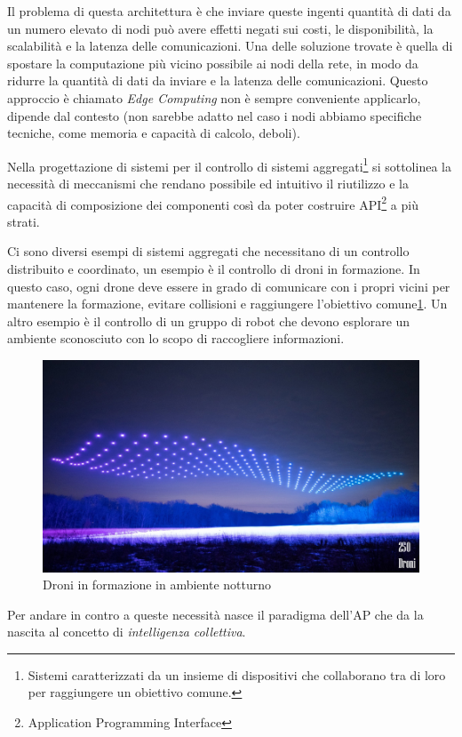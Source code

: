 \documentclass[12pt,a4paper,openright,twoside]{book}
\begin{document}
Il problema di questa architettura è che inviare queste ingenti quantità di dati da un numero elevato di nodi può avere effetti negati sui costi, le disponibilità, la scalabilità e la latenza delle comunicazioni. Una delle soluzione trovate è quella di spostare la computazione più vicino possibile ai nodi della rete, in modo da ridurre la quantità di dati da inviare e la latenza delle comunicazioni. Questo approccio è chiamato \textit{Edge Computing} non è sempre conveniente applicarlo, dipende dal contesto (non sarebbe adatto nel caso i nodi abbiamo specifiche tecniche, come memoria e capacità di calcolo, deboli). 

Nella progettazione di sistemi per il controllo di sistemi aggregati\footnote{Sistemi caratterizzati da un insieme di dispositivi che collaborano tra di loro per raggiungere un obiettivo comune.} si sottolinea la necessità di meccanismi che rendano possibile ed intuitivo il riutilizzo e la capacità di composizione dei componenti così da poter costruire API\footnote{Application Programming Interface} a più strati.

Ci sono diversi esempi di sistemi aggregati che necessitano di un controllo distribuito e coordinato, un esempio è il controllo di droni in formazione. In questo caso, ogni drone deve essere in grado di comunicare con i propri vicini per mantenere la formazione, evitare collisioni e raggiungere l'obiettivo comune\cref{fig:drones}. Un altro esempio è il controllo di un gruppo di robot che devono esplorare un ambiente sconosciuto con lo scopo di raccogliere informazioni.

\begin{figure}
    \centering
    \includegraphics[width=.7\linewidth]{figures/drones.jpg}
    \caption{Droni in formazione in ambiente notturno}
    \label{fig:drones}
\end{figure}

Per andare in contro a queste necessità nasce il paradigma dell'\ac{AP} che da la nascita al concetto di \textit{intelligenza collettiva}.
\end{document}
